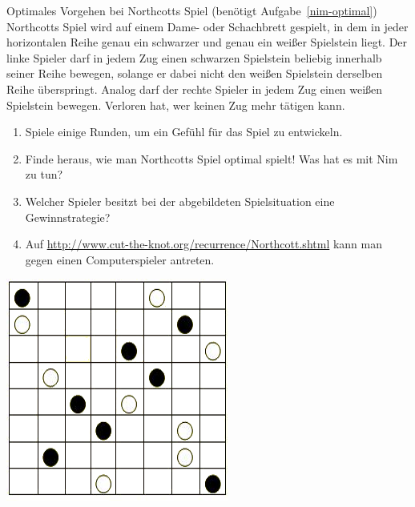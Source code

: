 \documentclass{../zirkelblatt}
\begin{document}
\begin{aufgabe}{Optimales Vorgehen bei Northcotts Spiel
(benötigt Aufgabe~\ref{nim-optimal})}
Northcotts Spiel wird auf einem Dame- oder Schachbrett gespielt, in dem in
jeder horizontalen Reihe genau ein schwarzer und genau ein weißer Spielstein liegt.
Der linke Spieler darf in jedem Zug einen schwarzen Spielstein beliebig
innerhalb seiner Reihe bewegen, solange er dabei nicht den weißen Spielstein
derselben Reihe überspringt. Analog darf der rechte Spieler in jedem Zug einen
weißen Spielstein bewegen. Verloren hat, wer keinen Zug mehr tätigen kann.

\begin{enumerate}
\item Spiele einige Runden, um ein Gefühl für das Spiel zu entwickeln.
\item Finde heraus, wie man Northcotts Spiel optimal spielt! Was hat es mit Nim zu tun?
\item Welcher Spieler besitzt bei der abgebildeten Spielsituation eine
Gewinnstrategie?
\item Auf \url{http://www.cut-the-knot.org/recurrence/Northcott.shtml} kann man
gegen einen Computerspieler antreten.
\end{enumerate}

\begin{center}
\includegraphics[scale=0.5]{northcott}
\end{center}
\end{aufgabe}
\end{document}
